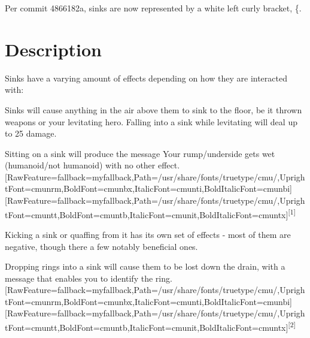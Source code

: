 Per commit 4866182a\footnotemark[29], sinks are now represented by a white left curly bracket\footnotemark[30], \{.


\section{Description}
\label{1}
Sinks have a varying amount of effects depending on how they are interacted with:




\begin{myitemize}\item{}Sinks will cause anything in the air above them to sink\footnotemark[31] to the floor, be it thrown weapons\footnotemark[32] or your levitating\footnotemark[33] hero\footnotemark[34]. Falling into a sink while levitating will deal up to 25 damage.
\end{myitemize}


\begin{myitemize}\item{}Sitting\footnotemark[35] on a sink will produce the message Your rump/underside gets wet (humanoid/not humanoid) with no other effect.\allowbreak{}\setmainfont{cmunrm.ttf}[RawFeature={fallback=myfallback},Path=/usr/share/fonts/truetype/cmu/,UprightFont=cmunrm,BoldFont=cmunbx,ItalicFont=cmunti,BoldItalicFont=cmunbi]\setmonofont{cmunrm.ttf}[RawFeature={fallback=myfallback},Path=/usr/share/fonts/truetype/cmu/,UprightFont=cmuntt,BoldFont=cmuntb,ItalicFont=cmunit,BoldItalicFont=cmuntx]\textsuperscript{{$\text{[}$}1{$\text{]}$}}
\end{myitemize}


\begin{myitemize}\item{}Kicking\footnotemark[36] a sink or quaffing\footnotemark[37] from it has its own set of effects -{} most of them are negative, though there a few notably beneficial ones.
\end{myitemize}


\begin{myitemize}\item{}Dropping rings\footnotemark[38] into a sink will cause them to be lost down the drain, with a message that enables you to identify the ring.\allowbreak{}\setmainfont{cmunrm.ttf}[RawFeature={fallback=myfallback},Path=/usr/share/fonts/truetype/cmu/,UprightFont=cmunrm,BoldFont=cmunbx,ItalicFont=cmunti,BoldItalicFont=cmunbi]\setmonofont{cmunrm.ttf}[RawFeature={fallback=myfallback},Path=/usr/share/fonts/truetype/cmu/,UprightFont=cmuntt,BoldFont=cmuntb,ItalicFont=cmunit,BoldItalicFont=cmuntx]\textsuperscript{{$\text{[}$}2{$\text{]}$}}
\end{myitemize}


